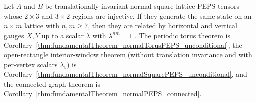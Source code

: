 \begin{theorem}%
    \label{thm:fundamentalTheorem_normalSquarePEPS}
    \notready
    Let $A$ and $B$ be translationally invariant normal square-lattice PEPS
    tensors whose $2\times 3$ and $3\times 2$ regions are injective. If they
    generate the same state on an $n\times m$ lattice with $n,m\ge 7$, then they
    are related by horizontal and vertical gauges $X,Y$ up to a scalar $\lambda$
    with $\lambda^{nm}=1$ \cite[Theorem~3]{Molnar2018NormalPEPS}.
    The periodic torus theorem is
    Corollary~\ref{thm:fundamentalTheorem_normalTorusPEPS_unconditional}, the
    open-rectangle interior-window theorem (without translation invariance and
    with per-vertex scalars $\lambda_v$) is
    Corollary~\ref{thm:fundamentalTheorem_normalSquarePEPS_unconditional}, and the
    connected-graph theorem is
    Corollary~\ref{thm:fundamentalTheorem_normalPEPS_connected}.
\end{theorem}

